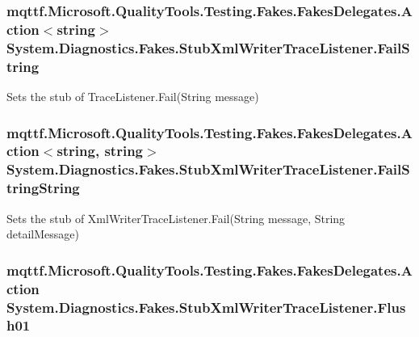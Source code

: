 \hypertarget{class_system_1_1_diagnostics_1_1_fakes_1_1_stub_xml_writer_trace_listener_a11184b312a8e5a6f45379854caa6bf32}{
\subsubsection[{Fail\-String}]{\setlength{\rightskip}{0pt plus 5cm}mqttf.\-Microsoft.\-Quality\-Tools.\-Testing.\-Fakes.\-Fakes\-Delegates.\-Action$<$string$>$ System.\-Diagnostics.\-Fakes.\-Stub\-Xml\-Writer\-Trace\-Listener.\-Fail\-String}}\label{class_system_1_1_diagnostics_1_1_fakes_1_1_stub_xml_writer_trace_listener_a11184b312a8e5a6f45379854caa6bf32}


Sets the stub of Trace\-Listener.\-Fail(\-String message)

\hypertarget{class_system_1_1_diagnostics_1_1_fakes_1_1_stub_xml_writer_trace_listener_a214c4ac86cc8cbfef96cecbb4ec44b9f}{
\subsubsection[{Fail\-String\-String}]{\setlength{\rightskip}{0pt plus 5cm}mqttf.\-Microsoft.\-Quality\-Tools.\-Testing.\-Fakes.\-Fakes\-Delegates.\-Action$<$string, string$>$ System.\-Diagnostics.\-Fakes.\-Stub\-Xml\-Writer\-Trace\-Listener.\-Fail\-String\-String}}\label{class_system_1_1_diagnostics_1_1_fakes_1_1_stub_xml_writer_trace_listener_a214c4ac86cc8cbfef96cecbb4ec44b9f}


Sets the stub of Xml\-Writer\-Trace\-Listener.\-Fail(\-String message, String detail\-Message)

\hypertarget{class_system_1_1_diagnostics_1_1_fakes_1_1_stub_xml_writer_trace_listener_a613872e2ef5fd38f998c847377efe4d3}{
\subsubsection[{Flush01}]{\setlength{\rightskip}{0pt plus 5cm}mqttf.\-Microsoft.\-Quality\-Tools.\-Testing.\-Fakes.\-Fakes\-Delegates.\-Action System.\-Diagnostics.\-Fakes.\-Stub\-Xml\-Writer\-Trace\-Listener.\-Flush01}}\label{class_system_1_1_diagnostics_1_1_fakes_1_1_stub_xml_writer_trace_listener_a613872e2ef5fd38f998c847377efe4d3}


